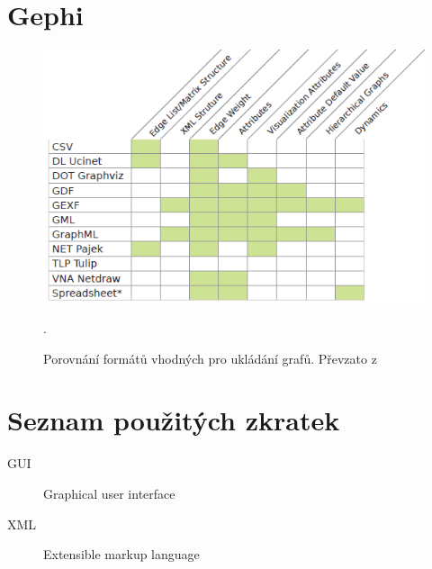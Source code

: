 \documentclass[thesis=M,czech]{FITthesis}[2014/05/6]
\begin{document}
\chapter{Gephi}
\begin{figure}\centering
 	\includegraphics[width=1\textwidth]{images/gephi/graph-format-table-comparison}
 	\caption[Porovnání formátů vhodných pro ukládání grafů]{Porovnání formátů vhodných pro ukládání grafů. Převzato z \cite{gephi}}.\label{fig:gephi-formats-comparation}
\end{figure}



\chapter{Seznam použitých zkratek}
\begin{description}
	\item[GUI] Graphical user interface
	\item[XML] Extensible markup language
\end{description}
\end{document}
